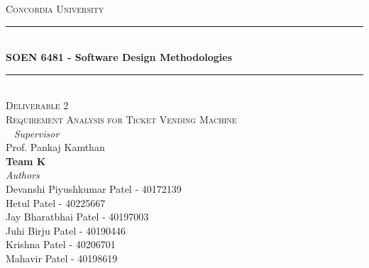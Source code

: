 \documentclass[a4paper, 11pt]{report}
\date{null}
\begin{document}
\begin{titlepage} %
	\newcommand{\HRule}{\rule{\linewidth}{0.5mm}} %
	
	\center %
	
	
	\textsc{\LARGE Concordia University}\\[1.5cm] %
	

	
	\HRule\\[0.4cm]
	
	{\huge\bfseries  SOEN 6481 - Software Design  Methodologies}\\[0.4cm] %
	
	\HRule\\[1.5cm]
	\textsc{\Large Deliverable 2}\\[0.5cm] %
	\textsc{\Large Requirement Analysis for Ticket Vending Machine}\\[0.5cm]
	
			
	~
			\large
			\textit{Supervisor}\\
			Prof. Pankaj Kamthan\\[0.5cm] %
    \vfill
    \large
            \textbf{Team K}\\
			\textit{Authors}\\
		Devanshi Piyushkumar Patel - \textsc{40172139}\\
            Hetul Patel - \textsc{40225667}\\
            Jay Bharatbhai Patel - \textsc{40197003}\\
            Juhi Birju Patel - \textsc{40190446}\\
            Krishna Patel - \textsc {40206701}\\
            Mahavir Patel - \textsc {40198619}\\[0.75cm]
            

\end{titlepage}
\end{document}
